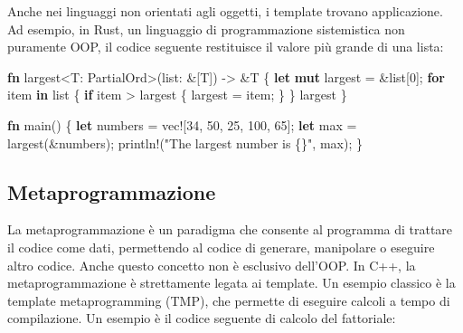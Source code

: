 \documentclass[
  letterpaper,
]{scrbook}
\newenvironment{Shaded}{\begin{snugshade}}{\end{snugshade}}
\newcommand{\BuiltInTok}[1]{\textcolor[rgb]{0.00,0.23,0.31}{#1}}
\newcommand{\ControlFlowTok}[1]{\textcolor[rgb]{0.00,0.23,0.31}{\textbf{#1}}}
\newcommand{\DecValTok}[1]{\textcolor[rgb]{0.68,0.00,0.00}{#1}}
\newcommand{\KeywordTok}[1]{\textcolor[rgb]{0.00,0.23,0.31}{\textbf{#1}}}
\newcommand{\NormalTok}[1]{\textcolor[rgb]{0.00,0.23,0.31}{#1}}
\newcommand{\OperatorTok}[1]{\textcolor[rgb]{0.37,0.37,0.37}{#1}}
\newcommand{\PreprocessorTok}[1]{\textcolor[rgb]{0.68,0.00,0.00}{#1}}
\newcommand{\StringTok}[1]{\textcolor[rgb]{0.13,0.47,0.30}{#1}}
\begin{document}
Anche nei linguaggi non orientati agli oggetti, i template trovano
applicazione. Ad esempio, in Rust, un linguaggio di programmazione
sistemistica non puramente OOP, il codice seguente restituisce il valore
più grande di una lista:

\begin{Shaded}
\begin{Highlighting}[]
\KeywordTok{fn}\NormalTok{ largest}\OperatorTok{\textless{}}\NormalTok{T}\OperatorTok{:} \BuiltInTok{PartialOrd}\OperatorTok{\textgreater{}}\NormalTok{(list}\OperatorTok{:} \OperatorTok{\&}\NormalTok{[T]) }\OperatorTok{{-}\textgreater{}} \OperatorTok{\&}\NormalTok{T }\OperatorTok{\{}
    \KeywordTok{let} \KeywordTok{mut}\NormalTok{ largest }\OperatorTok{=} \OperatorTok{\&}\NormalTok{list[}\DecValTok{0}\NormalTok{]}\OperatorTok{;}
    \ControlFlowTok{for}\NormalTok{ item }\KeywordTok{in}\NormalTok{ list }\OperatorTok{\{}
        \ControlFlowTok{if}\NormalTok{ item }\OperatorTok{\textgreater{}}\NormalTok{ largest }\OperatorTok{\{}
\NormalTok{            largest }\OperatorTok{=}\NormalTok{ item}\OperatorTok{;}
        \OperatorTok{\}}
    \OperatorTok{\}}
\NormalTok{    largest}
\OperatorTok{\}}

\KeywordTok{fn}\NormalTok{ main() }\OperatorTok{\{}
    \KeywordTok{let}\NormalTok{ numbers }\OperatorTok{=} \PreprocessorTok{vec!}\NormalTok{[}\DecValTok{34}\OperatorTok{,} \DecValTok{50}\OperatorTok{,} \DecValTok{25}\OperatorTok{,} \DecValTok{100}\OperatorTok{,} \DecValTok{65}\NormalTok{]}\OperatorTok{;}
    \KeywordTok{let}\NormalTok{ max }\OperatorTok{=}\NormalTok{ largest(}\OperatorTok{\&}\NormalTok{numbers)}\OperatorTok{;}
    \PreprocessorTok{println!}\NormalTok{(}\StringTok{"The largest number is \{\}"}\OperatorTok{,}\NormalTok{ max)}\OperatorTok{;}
\OperatorTok{\}}
\end{Highlighting}
\end{Shaded}

\subsection{Metaprogrammazione}\label{metaprogrammazione}

La metaprogrammazione è un paradigma che consente al programma di
trattare il codice come dati, permettendo al codice di generare,
manipolare o eseguire altro codice. Anche questo concetto non è
esclusivo dell'OOP. In C++, la metaprogrammazione è strettamente legata
ai template. Un esempio classico è la template metaprogramming (TMP),
che permette di eseguire calcoli a tempo di compilazione. Un esempio è
il codice seguente di calcolo del fattoriale:
\end{document}
